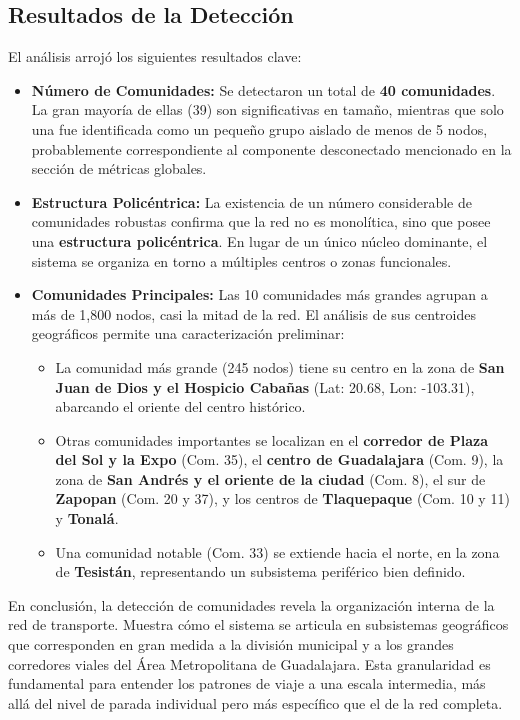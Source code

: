     \subsection{Resultados de la Detección}
    El análisis arrojó los siguientes resultados clave:
    \begin{itemize}
        \item \textbf{Número de Comunidades:} Se detectaron un total de \textbf{40 comunidades}. La gran mayoría de ellas (39) son significativas en tamaño, mientras que solo una fue identificada como un pequeño grupo aislado de menos de 5 nodos, probablemente correspondiente al componente desconectado mencionado en la sección de métricas globales.
        \item \textbf{Estructura Policéntrica:} La existencia de un número considerable de comunidades robustas confirma que la red no es monolítica, sino que posee una \textbf{estructura policéntrica}. En lugar de un único núcleo dominante, el sistema se organiza en torno a múltiples centros o zonas funcionales.
        \item \textbf{Comunidades Principales:} Las 10 comunidades más grandes agrupan a más de 1,800 nodos, casi la mitad de la red. El análisis de sus centroides geográficos permite una caracterización preliminar:
        \begin{itemize}
            \item La comunidad más grande (245 nodos) tiene su centro en la zona de \textbf{San Juan de Dios y el Hospicio Cabañas} (Lat: 20.68, Lon: -103.31), abarcando el oriente del centro histórico.
            \item Otras comunidades importantes se localizan en el \textbf{corredor de Plaza del Sol y la Expo} (Com. 35), el \textbf{centro de Guadalajara} (Com. 9), la zona de \textbf{San Andrés y el oriente de la ciudad} (Com. 8), el sur de \textbf{Zapopan} (Com. 20 y 37), y los centros de \textbf{Tlaquepaque} (Com. 10 y 11) y \textbf{Tonalá}.
            \item Una comunidad notable (Com. 33) se extiende hacia el norte, en la zona de \textbf{Tesistán}, representando un subsistema periférico bien definido.
        \end{itemize}
    \end{itemize}

    En conclusión, la detección de comunidades revela la organización interna de la red de transporte. Muestra cómo el sistema se articula en subsistemas geográficos que corresponden en gran medida a la división municipal y a los grandes corredores viales del Área Metropolitana de Guadalajara. Esta granularidad es fundamental para entender los patrones de viaje a una escala intermedia, más allá del nivel de parada individual pero más específico que el de la red completa.

